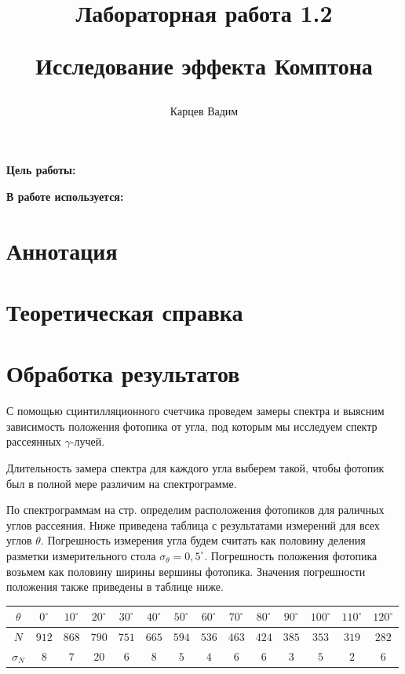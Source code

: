 \documentclass[12pt]{article}
\author{Карцев Вадим}
\title{Лабораторная работа 1.2

Исследование эффекта Комптона}
\begin{document}
  \maketitle

  \textbf{Цель работы:} %

  \textbf{В работе используется:} %

  \section{Аннотация}

  \section{Теоретическая справка}

  \newpage
  \section{Обработка результатов}

    С помощью сцинтилляционного счетчика проведем замеры спектра и выясним
    зависимость положения фотопика от угла, под которым мы исследуем спектр
    рассеянных $\gamma$-лучей.

    Длительность замера спектра для каждого угла выберем такой, чтобы фотопик был
    в полной мере различим на спектрограмме.

    По спектрограммам на стр. \pageref{add:spectres} определим расположения
    фотопиков для раличных углов рассеяния.
    Ниже приведена таблица с результатами измерений для всех углов $\theta$.
    Погрешность измерения угла будем считать как половину деления разметки
    измерительного стола $\sigma_{\theta} = 0,5^{\circ}$.
    Погрешность положения фотопика возьмем как половину ширины вершины фотопика.
    Значения погрешности положения также приведены в таблице ниже.\\

    \begin{tabular}{|c||c|c|c|c|c|c|c|c|c|c|c|c|c|}
      \hline
      $\theta$ & $0^{\circ}$ & $10^{\circ}$ & $20^{\circ}$ & $30^{\circ}$ & $40^{\circ}$ & $50^{\circ}$ & $60^{\circ}$ & $70^{\circ}$ & $80^{\circ}$ & $90^{\circ}$ & $100^{\circ}$ & $110^{\circ}$ & $120^{\circ}$ \\ \hline
      $N$ & $912$ & $868$ & $790$ & $751$ & $665$ & $594$ & $536$ & $463$ & $424$ & $385$ & $353$ & $319$ & $282$ \\ \hline
      $\sigma_N$ & $8$ & $7$ & $20$ & $6$ & $8$ & $5$ & $4$ & $6$ & $6$ & $3$ & $5$ & $2$ & $6$ \\
      \hline
    \end{tabular}\\
\end{document}

